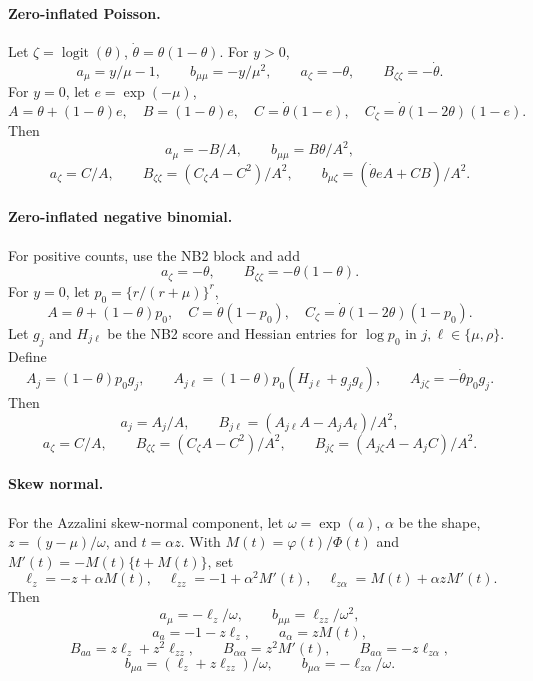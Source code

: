 \paragraph{Zero-inflated Poisson.}
Let \(\zeta=\operatorname{logit}(\theta)\),
\(\dot\theta=\theta(1-\theta)\).  For \(y>0\),
\[
    a_\mu=y/\mu-1,\qquad b_{\mu\mu}=-y/\mu^2,\qquad
    a_\zeta=-\theta,\qquad B_{\zeta\zeta}=-\dot\theta.
\]
For \(y=0\), let \(e=\exp(-\mu)\),
\[
    A=\theta+(1-\theta)e,\quad B=(1-\theta)e,\quad
    C=\dot\theta(1-e),\quad
    C_\zeta=\dot\theta(1-2\theta)(1-e).
\]
Then
\[
    a_\mu=-B/A,\qquad b_{\mu\mu}=B\theta/A^2,
\]
\[
    a_\zeta=C/A,\qquad
    B_{\zeta\zeta}=(C_\zeta A-C^2)/A^2,\qquad
    b_{\mu\zeta}=(\dot\theta eA+CB)/A^2.
\]

\paragraph{Zero-inflated negative binomial.}
For positive counts, use the NB2 block and add
\[
    a_\zeta=-\theta,\qquad B_{\zeta\zeta}=-\theta(1-\theta).
\]
For \(y=0\), let \(p_0=\{r/(r+\mu)\}^r\),
\[
    A=\theta+(1-\theta)p_0,\quad
    C=\dot\theta(1-p_0),\quad
    C_\zeta=\dot\theta(1-2\theta)(1-p_0).
\]
Let \(g_j\) and \(H_{j\ell}\) be the NB2 score and Hessian entries for
\(\log p_0\) in \(j,\ell\in\{\mu,\rho\}\).  Define
\[
    A_j=(1-\theta)p_0g_j,\qquad
    A_{j\ell}=(1-\theta)p_0(H_{j\ell}+g_jg_\ell),\qquad
    A_{j\zeta}=-\dot\theta p_0g_j .
\]
Then
\[
    a_j=A_j/A,\qquad
    B_{j\ell}=(A_{j\ell}A-A_jA_\ell)/A^2,
\]
\[
    a_\zeta=C/A,\qquad
    B_{\zeta\zeta}=(C_\zeta A-C^2)/A^2,\qquad
    B_{j\zeta}=(A_{j\zeta}A-A_jC)/A^2.
\]

\paragraph{Skew normal.}
For the Azzalini skew-normal component, let \(\omega=\exp(a)\),
\(\alpha\) be the shape, \(z=(y-\mu)/\omega\), and \(t=\alpha z\).
With \(M(t)=\varphi(t)/\Phi(t)\) and
\(M'(t)=-M(t)\{t+M(t)\}\), set
\[
    \ell_z=-z+\alpha M(t),\quad
    \ell_{zz}=-1+\alpha^2M'(t),\quad
    \ell_{z\alpha}=M(t)+\alpha zM'(t).
\]
Then
\[
    a_\mu=-\ell_z/\omega,\qquad
    b_{\mu\mu}=\ell_{zz}/\omega^2,
\]
\[
    a_a=-1-z\ell_z,\qquad
    a_\alpha=zM(t),
\]
\[
    B_{aa}=z\ell_z+z^2\ell_{zz},\qquad
    B_{\alpha\alpha}=z^2M'(t),\qquad
    B_{a\alpha}=-z\ell_{z\alpha},
\]
\[
    b_{\mu a}=(\ell_z+z\ell_{zz})/\omega,\qquad
    b_{\mu\alpha}=-\ell_{z\alpha}/\omega.
\]

